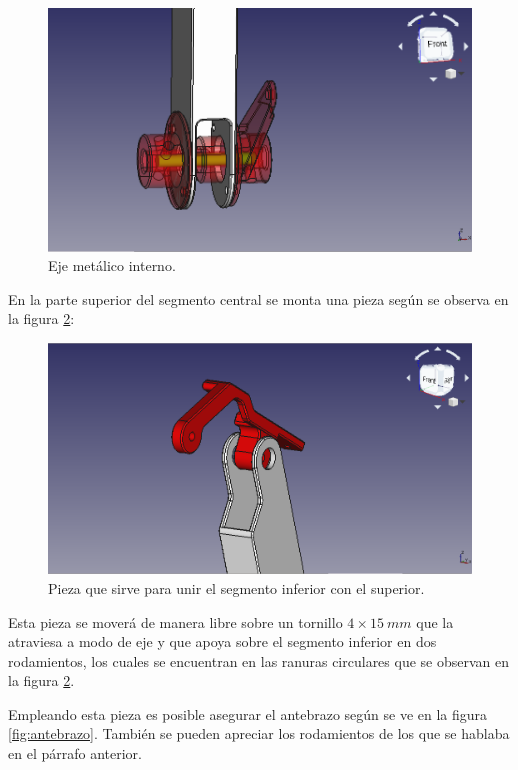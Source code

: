 \begin{figure}[H]
    \centering 
    \includegraphics[width=1\linewidth]{pictures/EjeInterno.png}
    \caption{Eje metálico interno.}
    \label{fig:eje_metalico_interno}
\end{figure}

En la parte superior del segmento central se monta una pieza según se observa en la figura \ref{fig:pieza_forma_rara}:

\begin{figure}[H]
    \centering 
    \includegraphics[width=1\linewidth]{pictures/PiezaConFormaRara.png}
    \caption{Pieza que sirve para unir el segmento inferior con el superior.}
    \label{fig:pieza_forma_rara}
\end{figure}

Esta pieza se moverá de manera libre sobre un tornillo $4 \times 15~mm$ que la atraviesa a modo de eje y que apoya sobre el segmento inferior en dos rodamientos, los cuales se encuentran en las ranuras circulares que se observan en la figura \ref{fig:pieza_forma_rara}.

Empleando esta pieza es posible asegurar el antebrazo según se ve en la figura \ref{fig:antebrazo}. También se pueden apreciar los rodamientos de los que se hablaba en el párrafo anterior.

